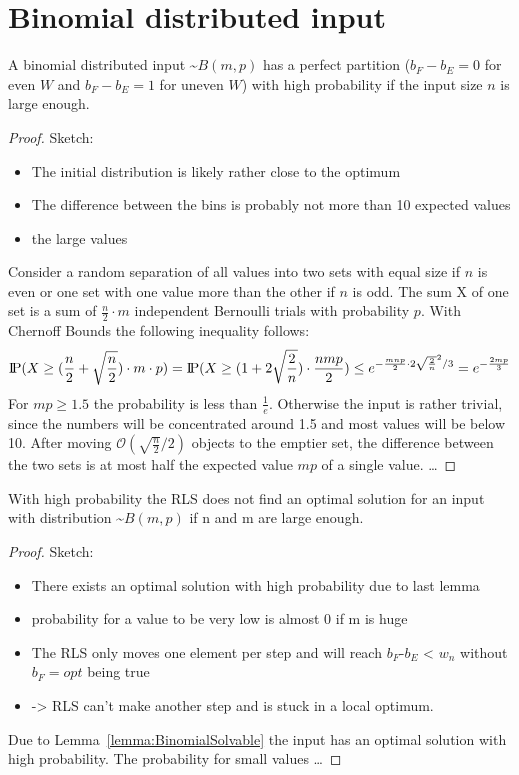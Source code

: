 \section{Binomial distributed input}
\begin{lemma}\label{lemma:BinomialSolvable}
    A binomial distributed input \textasciitilde$B(m,p)$ has a perfect partition ($b_F - b_E = 0$ for even $W$ and $b_F - b_E = 1$ for uneven $W$) with high probability if the input size $n$ is large enough.
\end{lemma}
\begin{proof}
    Sketch:
    \begin{itemize}
        \item The initial distribution is likely rather close to the optimum
        \item The difference between the bins is probably not more than 10 expected values
        \item the large values  
    \end{itemize}
    Consider a random separation of all values into two sets with equal size if $n$ is even or one set with one value more than the other if $n$ is odd. The sum X of one set is a sum of $\frac{n}{2}\cdot m$ independent Bernoulli trials with probability $p$. With Chernoff Bounds the following inequality follows: 
    \[\text{I\kern-0.15em P}(X\ge(\frac{n}{2}+\sqrt{\frac{n}{2}})\cdot m \cdot p) = \text{I\kern-0.15em P}(X\ge(1+2\sqrt{\frac{2}{n}})\cdot \frac{nmp}{2}) \le e^{-\frac{mnp}{2}\cdot2\sqrt{\frac{2}{n}}^2 /3} = e^{-\frac{2mp}{3}}\]
    For $mp\ge1.5$ the probability is less than $\frac{1}{e}$. Otherwise the input is rather trivial, since the numbers will be concentrated around 1.5 and most values will be below 10.\newline
    After moving $\mathcal{O}(\sqrt{\frac{n}{2}}/2)$ objects to the emptier set, the difference between the two sets is at most half the expected value $mp$ of a single value.
    \dots
\end{proof}


\begin{lemma}
    With high probability the RLS does not find an optimal solution for an input with distribution \textasciitilde$B(m,p)$ if n and m are large enough.
\end{lemma}
\begin{proof}
    Sketch:
    \begin{itemize}
        \item There exists an optimal solution with high probability due to last lemma
        \item probability for a value to be very low is almost 0 if m is huge
        \item The RLS only moves one element per step and will reach $b_F$-$b_E$ < $w_n$ without $b_F= opt$ being true
        \item -> RLS can't make another step and is stuck in a local optimum.
    \end{itemize}
    Due to Lemma~\ref{lemma:BinomialSolvable} the input has an optimal solution with high probability. The probability for small values \dots
\end{proof}